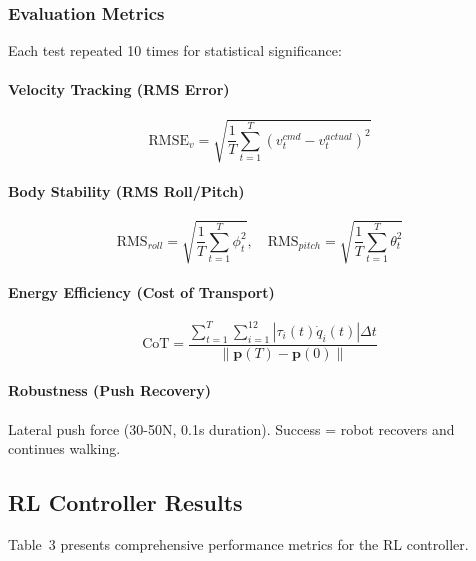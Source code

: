 \documentclass[12pt,a4paper]{article}
\begin{document}
\subsubsection{Evaluation Metrics}

Each test repeated 10 times for statistical significance:

\paragraph{Velocity Tracking (RMS Error)}
\begin{equation}
\text{RMSE}_v = \sqrt{\frac{1}{T}\sum_{t=1}^{T}(v^{cmd}_t - v^{actual}_t)^2}
\end{equation}

\paragraph{Body Stability (RMS Roll/Pitch)}
\begin{equation}
\text{RMS}_{roll} = \sqrt{\frac{1}{T}\sum_{t=1}^{T}\phi_t^2}, \quad \text{RMS}_{pitch} = \sqrt{\frac{1}{T}\sum_{t=1}^{T}\theta_t^2}
\end{equation}

\paragraph{Energy Efficiency (Cost of Transport)}
\begin{equation}
\text{CoT} = \frac{\sum_{t=1}^{T}\sum_{i=1}^{12}|\tau_i(t)\dot{q}_i(t)|\Delta t}{\|\mathbf{p}(T) - \mathbf{p}(0)\|}
\end{equation}

\paragraph{Robustness (Push Recovery)}
Lateral push force (30-50N, 0.1s duration). Success = robot recovers and continues walking.

\subsection{RL Controller Results}

Table~3 presents comprehensive performance metrics for the RL controller.
\end{document}
